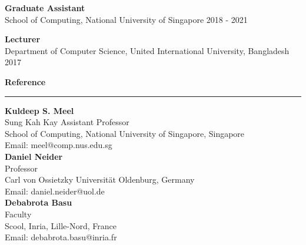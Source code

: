 \documentclass[a4paper,10pt,final]{article}
\newcommand{\Sep}{\vspace{1.5em}}
\newcommand{\SmallSep}{\vspace{0.5em}}
\begin{document}
\SmallSep
\textbf{Graduate Assistant}\\
School of Computing, National University of Singapore \hspace*{\fill} 2018  - 2021

\SmallSep
\textbf{Lecturer}\\
Department of Computer Science, United International University, Bangladesh \hspace*{\fill} 2017


\Sep
\Large{\textbf{Reference}}\\
\noindent\rule{\textwidth}{1pt}
\normalsize
\textbf{Kuldeep S. Meel}\\
Sung Kah Kay Assistant Professor\\ 
School of Computing, National University of Singapore, Singapore\\
Email: meel@comp.nus.edu.sg\\

\textbf{Daniel Neider}\\
Professor\\
Carl von Ossietzky Universit\"at Oldenburg, Germany\\
Email: daniel.neider@uol.de\\

\textbf{Debabrota Basu}\\
Faculty\\
Scool, Inria, Lille-Nord, France\\
Email: debabrota.basu@inria.fr\\
\end{document}
